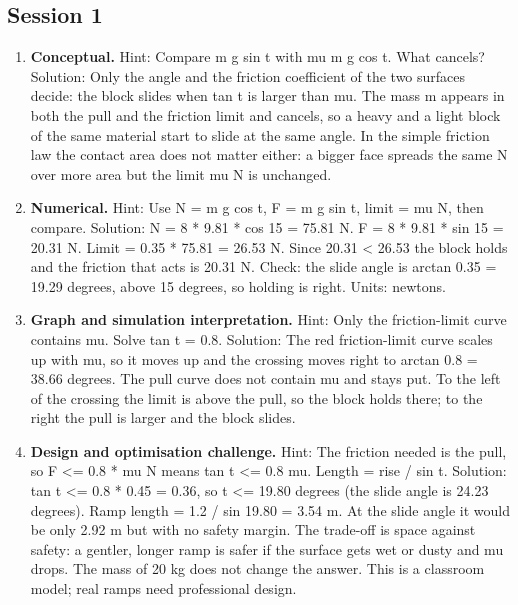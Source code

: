 \documentclass[11pt,a4paper]{article}
\begin{document}
\subsection*{Session 1}
\begin{enumerate}[nosep]
\item \textbf{Conceptual.} Hint: Compare m g sin t with mu m g cos t. What cancels? Solution: Only the angle and the friction coefficient of the two surfaces decide: the block slides when tan t is larger than mu. The mass m appears in both the pull and the friction limit and cancels, so a heavy and a light block of the same material start to slide at the same angle. In the simple friction law the contact area does not matter either: a bigger face spreads the same N over more area but the limit mu N is unchanged.
\item \textbf{Numerical.} Hint: Use N = m g cos t, F = m g sin t, limit = mu N, then compare. Solution: N = 8 * 9.81 * cos 15 = 75.81 N. F = 8 * 9.81 * sin 15 = 20.31 N. Limit = 0.35 * 75.81 = 26.53 N. Since 20.31 \textless{} 26.53 the block holds and the friction that acts is 20.31 N. Check: the slide angle is arctan 0.35 = 19.29 degrees, above 15 degrees, so holding is right. Units: newtons.
\item \textbf{Graph and simulation interpretation.} Hint: Only the friction-limit curve contains mu. Solve tan t = 0.8. Solution: The red friction-limit curve scales up with mu, so it moves up and the crossing moves right to arctan 0.8 = 38.66 degrees. The pull curve does not contain mu and stays put. To the left of the crossing the limit is above the pull, so the block holds there; to the right the pull is larger and the block slides.
\item \textbf{Design and optimisation challenge.} Hint: The friction needed is the pull, so F \textless{}= 0.8 * mu N means tan t \textless{}= 0.8 mu. Length = rise / sin t. Solution: tan t \textless{}= 0.8 * 0.45 = 0.36, so t \textless{}= 19.80 degrees (the slide angle is 24.23 degrees). Ramp length = 1.2 / sin 19.80 = 3.54 m. At the slide angle it would be only 2.92 m but with no safety margin. The trade-off is space against safety: a gentler, longer ramp is safer if the surface gets wet or dusty and mu drops. The mass of 20 kg does not change the answer. This is a classroom model; real ramps need professional design.
\end{enumerate}
\end{document}
